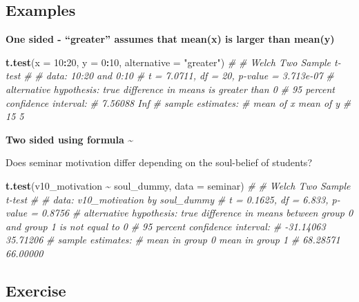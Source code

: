\documentclass[
]{book}
\newenvironment{Shaded}{\begin{snugshade}}{\end{snugshade}}
\newcommand{\AttributeTok}[1]{\textcolor[rgb]{0.13,0.29,0.53}{#1}}
\newcommand{\CommentTok}[1]{\textcolor[rgb]{0.56,0.35,0.01}{\textit{#1}}}
\newcommand{\DecValTok}[1]{\textcolor[rgb]{0.00,0.00,0.81}{#1}}
\newcommand{\FunctionTok}[1]{\textcolor[rgb]{0.13,0.29,0.53}{\textbf{#1}}}
\newcommand{\NormalTok}[1]{#1}
\newcommand{\SpecialCharTok}[1]{\textcolor[rgb]{0.81,0.36,0.00}{\textbf{#1}}}
\newcommand{\StringTok}[1]{\textcolor[rgb]{0.31,0.60,0.02}{#1}}
\begin{document}
\subsection{Examples}\label{examples}

\textbf{One sided - ``greater'' assumes that mean(x) is larger than mean(y)}

\begin{Shaded}
\begin{Highlighting}[]
\FunctionTok{t.test}\NormalTok{(}\AttributeTok{x =} \DecValTok{10}\SpecialCharTok{:}\DecValTok{20}\NormalTok{, }\AttributeTok{y =} \DecValTok{0}\SpecialCharTok{:}\DecValTok{10}\NormalTok{, }\AttributeTok{alternative =} \StringTok{"greater"}\NormalTok{)}
\CommentTok{\# }
\CommentTok{\#   Welch Two Sample t{-}test}
\CommentTok{\# }
\CommentTok{\# data:  10:20 and 0:10}
\CommentTok{\# t = 7.0711, df = 20, p{-}value = 3.713e{-}07}
\CommentTok{\# alternative hypothesis: true difference in means is greater than 0}
\CommentTok{\# 95 percent confidence interval:}
\CommentTok{\#  7.56088     Inf}
\CommentTok{\# sample estimates:}
\CommentTok{\# mean of x mean of y }
\CommentTok{\#        15         5}
\end{Highlighting}
\end{Shaded}

\textbf{Two sided using formula \textasciitilde{} }

Does seminar motivation differ depending on the soul-belief of students?

\begin{Shaded}
\begin{Highlighting}[]
\FunctionTok{t.test}\NormalTok{(v10\_motivation }\SpecialCharTok{\textasciitilde{}}\NormalTok{ soul\_dummy, }\AttributeTok{data =}\NormalTok{ seminar)}
\CommentTok{\# }
\CommentTok{\#   Welch Two Sample t{-}test}
\CommentTok{\# }
\CommentTok{\# data:  v10\_motivation by soul\_dummy}
\CommentTok{\# t = 0.1625, df = 6.833, p{-}value = 0.8756}
\CommentTok{\# alternative hypothesis: true difference in means between group 0 and group 1 is not equal to 0}
\CommentTok{\# 95 percent confidence interval:}
\CommentTok{\#  {-}31.14063  35.71206}
\CommentTok{\# sample estimates:}
\CommentTok{\# mean in group 0 mean in group 1 }
\CommentTok{\#        68.28571        66.00000}
\end{Highlighting}
\end{Shaded}

\subsection{\texorpdfstring{Exercise }{Exercise }}\label{exercise-4}
\end{document}
